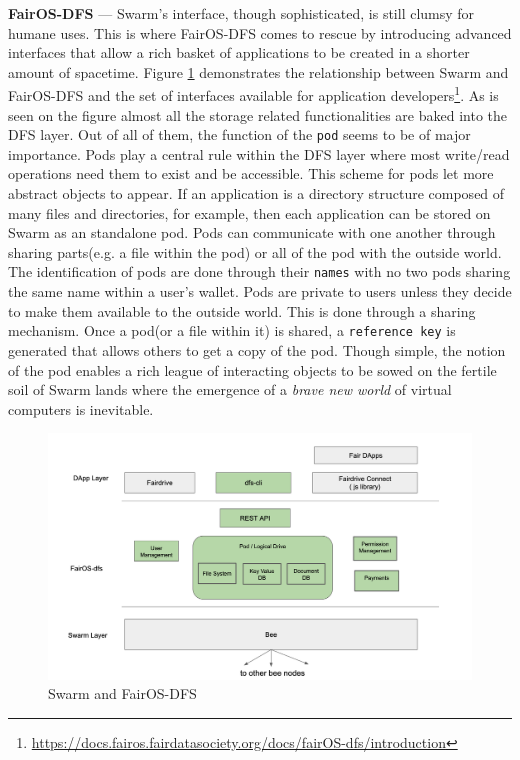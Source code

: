 \documentclass[a4paper, 10pt]{article}
\begin{document}
\par
\textbf{FairOS-DFS} --- Swarm's interface, though sophisticated, is still clumsy for humane uses. This is where FairOS-DFS comes to rescue by introducing advanced interfaces that allow a rich basket of applications to be created in a shorter amount of spacetime. Figure  \ref{swarmfair} demonstrates the relationship between Swarm and FairOS-DFS and the set of interfaces available for application developers\footnote{\url{https://docs.fairos.fairdatasociety.org/docs/fairOS-dfs/introduction}}. As is seen on the figure almost all the storage related functionalities are baked into the DFS layer. Out of all of them, the function of the \texttt{pod} seems to be of major importance. Pods play a central rule within the DFS layer where most write/read operations need them to exist and be accessible. This scheme for pods let more abstract objects to appear. If an application is a directory structure composed of many files and directories, for example, then each application can be stored on Swarm as an standalone pod. Pods can communicate with one another through sharing parts(e.g. a file within the pod) or all of the pod with the outside world. The identification of pods are done through their \texttt{names} with no two pods sharing the same name within a user's wallet. Pods are private to users unless they decide to make them available to the outside world. This is done through a sharing mechanism. Once a pod(or a file within it) is shared, a \texttt{reference key} is generated that allows others to get a copy of the pod. Though simple, the notion of the pod enables a rich league of interacting objects to be sowed on the fertile soil of Swarm lands where the emergence of a \textit{brave new world} of virtual computers is inevitable.
\begin{figure}
\includegraphics[scale=0.3,keepaspectratio=true]{images/swarm-fair.png}
\caption{\label{swarmfair}Swarm and \textcolor{fairgreen}{FairOS-DFS}}
\end{figure}
\end{document}
